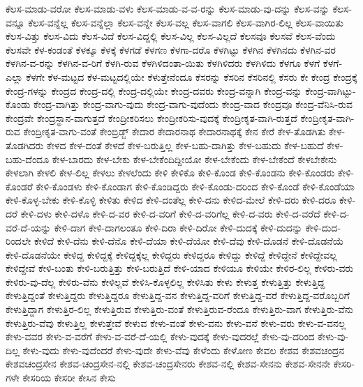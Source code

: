 {ಕೆಲಸ-ಮಾಡು-ವರೋ
ಕೆಲಸ-ಮಾಡು-ವಳು
ಕೆಲಸ-ಮಾಡು-ವ-ವ-ರನ್ನು
ಕೆಲಸ-ಮಾಡು-ವು-ದನ್ನು
ಕೆಲಸ-ವನ್ನು
ಕೆಲಸ-ವನ್ನೂ
ಕೆಲಸ-ವನ್ನೆಲ್ಲ
ಕೆಲಸ-ವನ್ನೆಲ್ಲಾ
ಕೆಲಸ-ವನ್ನೇ
ಕೆಲಸ-ವಲ್ಲ
ಕೆಲಸ-ವಾಗಲಿ
ಕೆಲಸ-ವಾಗಿರ-ಲಿಲ್ಲ
ಕೆಲಸ-ವಾಯಿತು
ಕೆಲಸ-ವಿತ್ತು
ಕೆಲಸ-ವಿದು
ಕೆಲಸ-ವಿದೆ
ಕೆಲಸ-ವಿದ್ದಲ್ಲಿ
ಕೆಲಸ-ವಿಲ್ಲ
ಕೆಲಸ-ವಿಲ್ಲದೆ
ಕೆಲಸವೂ
ಕೆಲಸವೆ
ಕೆಲಸ-ವೆಂದು
ಕೆಲಸವೇ
ಕೆಳ-ಕಂಡಂತೆ
ಕೆಳಕ್ಕೂ
ಕೆಳಕ್ಕೆ
ಕೆಳಗಡೆ
ಕೆಳಗಣ
ಕೆಳಗಾ-ದರೊ
ಕೆಳಗಿಟ್ಟು
ಕೆಳಗಿನ
ಕೆಳಗಿನದು
ಕೆಳಗಿನ-ವರ
ಕೆಳಗಿನ-ವ-ರನ್ನು
ಕೆಳಗಿನ-ವ-ರಿಗೆ
ಕೆಳಗಿ-ರುವ
ಕೆಳಗಿಳಿದಂತಾ-ಯಿತು
ಕೆಳಗಿಳಿದರು
ಕೆಳಗಿಳಿದು
ಕೆಳಗೂ
ಕೆಳಗೆ
ಕೆಳಗೆ-ಎಲ್ಲಾ
ಕೆಳಗೇ
ಕೆಳ-ಮಟ್ಟದ
ಕೆಳ-ಮಟ್ಟದಲ್ಲಿಯೇ
ಕೆಳುತ್ತೇನೆಂದೂ
ಕೆಸರನ್ನು
ಕೆಸರಿನ
ಕೆಸರಿನಲ್ಲಿ
ಕೆಸರು
ಕೇ
ಕೇಂದ್ರ
ಕೇಂದ್ರಕ್ಕೆ
ಕೇಂದ್ರ-ಗಳನ್ನು
ಕೇಂದ್ರದ
ಕೇಂದ್ರ-ದಲ್ಲಿ
ಕೇಂದ್ರ-ದಲ್ಲಿಯೇ
ಕೇಂದ್ರ-ದವರು
ಕೇಂದ್ರ-ವನ್ನಾಗಿ
ಕೇಂದ್ರ-ವನ್ನು
ಕೇಂದ್ರ-ವಾಗಿಟ್ಟು-ಕೊಂಡು
ಕೇಂದ್ರ-ವಾಗಿತ್ತು
ಕೇಂದ್ರ-ವಾಗು-ವುದು
ಕೇಂದ್ರ-ವಾಗು-ವುದೆಂದು
ಕೇಂದ್ರ-ವಾದ
ಕೇಂದ್ರವೂ
ಕೇಂದ್ರ-ವೆನಿಸಿ-ರುವ
ಕೇಂದ್ರವೇ
ಕೇಂದ್ರಸ್ಥಾನ-ವಾಗುತ್ತದೆ
ಕೇಂದ್ರೀಕರಿಸಲು
ಕೇಂದ್ರೀಕರಿಸು-ವುದಕ್ಕೆ
ಕೇಂದ್ರೀಕೃತ-ವಾಗಿ-ರುತ್ತದೆ
ಕೇಂದ್ರೀಕೃತ-ವಾಗಿ-ರುವ
ಕೇಂದ್ರೀಕೃತ-ವಾಗು-ವಂತೆ
ಕೇಂಬ್ರಿಡ್ಜ್
ಕೇದಾರ
ಕೇದಾರನಾಥ
ಕೇದಾರನಾಥಕ್ಕೆ
ಕೇನ
ಕೇರೆ
ಕೇಳ-ತೊಡಗಿತು
ಕೇಳ-ತೊಡಗಿದರು
ಕೇಳದ
ಕೇಳ-ದಂತೆ
ಕೇಳದೆ
ಕೇಳ-ಬರುತ್ತಿಲ್ಲ
ಕೇಳ-ಬಹು-ದಾಗಿತ್ತು
ಕೇಳ-ಬಹುದು
ಕೇಳ-ಬಹುದೆ
ಕೇಳ-ಬಹು-ದೆಂದೂ
ಕೇಳ-ಬಾರದು
ಕೇಳ-ಬೇಕು
ಕೇಳ-ಬೇಕೆಂದಿದ್ದೀಯೋ
ಕೇಳ-ಬೇಕೆಂದು
ಕೇಳ-ಬೇಕೆಂದೆ
ಕೇಳಬೇಕೇನು
ಕೇಳಲಾಗಿ
ಕೇಳಲಿ
ಕೇಳ-ಲಿಲ್ಲ
ಕೇಳಲು
ಕೇಳಲೆಂದು
ಕೇಳಿ
ಕೇಳಿಕೊ
ಕೇಳಿ-ಕೊಂಡ
ಕೇಳಿ-ಕೊಂಡನು
ಕೇಳಿ-ಕೊಂಡರು
ಕೇಳಿ-ಕೊಂಡರೆ
ಕೇಳಿ-ಕೊಂಡಳು
ಕೇಳಿ-ಕೊಂಡಾಗ
ಕೇಳಿ-ಕೊಂಡಿದ್ದರು
ಕೇಳಿ-ಕೊಂಡು-ದರಿಂದ
ಕೇಳಿ-ಕೊಂಡೆ
ಕೇಳಿ-ಕೊಂಡೆಯಾ
ಕೇಳಿ-ಕೊಳ್ಳ-ಬೇಕು
ಕೇಳಿ-ಕೊಳ್ಳಿ
ಕೇಳಿತು
ಕೇಳಿದ
ಕೇಳಿ-ದಂತೆಲ್ಲ
ಕೇಳಿ-ದನು
ಕೇಳಿದ-ಮೇಲೆ
ಕೇಳಿ-ದರು
ಕೇಳಿ-ದರೂ
ಕೇಳಿ-ದರೆ
ಕೇಳಿ-ದಳು
ಕೇಳಿ-ದಳೊ
ಕೇಳಿ-ದ-ವರ
ಕೇಳಿ-ದ-ವರಿಗೆ
ಕೇಳಿ-ದ-ವರಿಗೆಲ್ಲ
ಕೇಳಿ-ದ-ವರು
ಕೇಳಿ-ದ-ವರೆದೆ
ಕೇಳಿ-ದ-ವರೆ-ದೆ-ಯನ್ನು
ಕೇಳಿ-ದಾಗ
ಕೇಳಿ-ದಾಗಲಂತೂ
ಕೇಳಿ-ದಿರಾ
ಕೇಳಿ-ದಿರೋ
ಕೇಳಿ-ದುದಕ್ಕೆ
ಕೇಳಿ-ದುದನ್ನು
ಕೇಳಿ-ದುದ-ರಿಂದಲೇ
ಕೇಳಿದೆ
ಕೇಳಿ-ದೆನು
ಕೇಳಿ-ದೆನೊ
ಕೇಳಿ-ದೆಯಾ
ಕೇಳಿ-ದೆಯೋ
ಕೇಳಿ-ದೆವು
ಕೇಳಿ-ದೊಡನೆ
ಕೇಳಿ-ದೊಡನೆಯೆ
ಕೇಳಿ-ದೊಡನೆಯೇ
ಕೇಳಿದ್ದ
ಕೇಳಿದ್ದಕ್ಕೆ
ಕೇಳಿದ್ದಕ್ಕೆಲ್ಲ
ಕೇಳಿದ್ದರು
ಕೇಳಿದ್ದರೂ
ಕೇಳಿದ್ದು
ಕೇಳಿದ್ದೆ
ಕೇಳಿದ್ದೇನೆ
ಕೇಳಿದ್ದೇವಲ್ಲ
ಕೇಳಿದ್ದೇವೆ
ಕೇಳಿ-ಬಂತು
ಕೇಳಿ-ಬರುತ್ತಿತ್ತು
ಕೇಳಿ-ಬರುತ್ತಿದೆ
ಕೇಳಿ-ಯಾದ
ಕೇಳಿಯೂ
ಕೇಳಿಯೇ
ಕೇಳಿರ-ಲಿಲ್ಲ
ಕೇಳಿರು-ವರು
ಕೇಳಿರು-ವು-ದೆಲ್ಲ
ಕೇಳಿರು-ವೆನು
ಕೇಳಿಲ್ಲವೆ
ಕೇಳಿಸಿ-ಕೊಳ್ಳಲಿಲ್ಲ
ಕೇಳಿಸಿತು
ಕೇಳು
ಕೇಳುತ್ತ
ಕೇಳುತ್ತಿತ್ತು
ಕೇಳುತ್ತಿದ್ದ
ಕೇಳುತ್ತಿದ್ದಂತೆ
ಕೇಳುತ್ತಿದ್ದರು
ಕೇಳುತ್ತಿದ್ದರೂ
ಕೇಳುತ್ತಿದ್ದ-ವನ
ಕೇಳುತ್ತಿದ್ದ-ವರಿಗೆ
ಕೇಳುತ್ತಿದ್ದ-ವರೆ
ಕೇಳುತ್ತಿದ್ದ-ವರೊಬ್ಬರಿಗೆ
ಕೇಳುತ್ತಿದ್ದಾಗ
ಕೇಳುತ್ತಿರ-ಲಿಲ್ಲ
ಕೇಳುತ್ತಿರುವ
ಕೇಳುತ್ತಿರು-ವಂತೆ
ಕೇಳುತ್ತಿರುವ-ರೆಂದೂ
ಕೇಳುತ್ತಿರು-ವಾಗ
ಕೇಳುತ್ತಿರು-ವೆನು
ಕೇಳುತ್ತಿರು-ವೆವು
ಕೇಳುತ್ತಿಲ್ಲ
ಕೇಳುತ್ತೇವೆ
ಕೇಳುವ
ಕೇಳು-ವಂತೆ
ಕೇಳು-ವನು
ಕೇಳು-ವನೆ
ಕೇಳು-ವರು
ಕೇಳು-ವ-ವನಲ್ಲ
ಕೇಳು-ವವರ
ಕೇಳು-ವ-ವರೆಗೆ
ಕೇಳು-ವ-ವರೆ-ದೆ-ಯಲ್ಲಿ
ಕೇಳು-ವುದಕ್ಕೆ
ಕೇಳು-ವುದರಲ್ಲೆ
ಕೇಳು-ವು-ದರಿಂದ
ಕೇಳು-ವು-ದಿಲ್ಲ
ಕೇಳು-ವುದು
ಕೇಳು-ವುದೆಂದರೆ
ಕೇಳು-ವುದೇ
ಕೇಳು-ವೆವು
ಕೇಳೆಂದು
ಕೇಳೋಣ
ಕೇವಲ
ಕೇಶವ
ಕೇಶವಚಂದ್ರನ
ಕೇಶವಚಂದ್ರಸೇನ
ಕೇಶವ-ಚಂದ್ರಸೇನ-ನಲ್ಲಿ
ಕೇಶವ-ಚಂದ್ರಸೇನರು
ಕೇಶವ-ನಲ್ಲಿ
ಕೇಶವ-ಸೇನನು
ಕೇಶವ-ಸೇನನೇ
ಕೇಸರಿ-ಗಳೇ
ಕೇಸರಿಯ
ಕೇಸರೀ
ಕೇಸಿನ
ಕೇಸು
}
